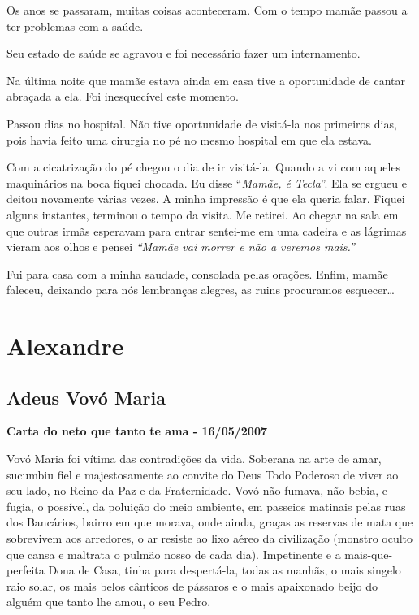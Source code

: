 \documentclass[
  brazil,
  a6paper,
  oneside,
  landscape,
  14pt]{scrbook}
\begin{document}
Os anos se passaram, muitas coisas aconteceram. Com o tempo mamãe passou
a ter problemas com a saúde.

Seu estado de saúde se agravou e foi necessário fazer um internamento.

Na última noite que mamãe estava ainda em casa tive a oportunidade de
cantar abraçada a ela. Foi inesquecível este momento.

Passou dias no hospital. Não tive oportunidade de visitá-la nos
primeiros dias, pois havia feito uma cirurgia no pé no mesmo hospital em
que ela estava.

Com a cicatrização do pé chegou o dia de ir visitá-la. Quando a vi com
aqueles maquinários na boca fiquei chocada. Eu disse ``\emph{Mamãe, é
Tecla}''. Ela se ergueu e deitou novamente várias vezes. A minha
impressão é que ela queria falar. Fiquei alguns instantes, terminou o
tempo da visita. Me retirei. Ao chegar na sala em que outras irmãs
esperavam para entrar sentei-me em uma cadeira e as lágrimas vieram aos
olhos e pensei \emph{``Mamãe vai morrer e não a veremos mais.''}

Fui para casa com a minha saudade, consolada pelas orações. Enfim, mamãe
faleceu, deixando para nós lembranças alegres, as ruins procuramos
esquecer\ldots{}

\hypertarget{alexandre}{%
\section{Alexandre}\label{alexandre}}

\hypertarget{adeus-vovuxf3-maria}{%
\subsection{Adeus Vovó Maria}\label{adeus-vovuxf3-maria}}

\textbf{Carta do neto que tanto te ama - 16/05/2007}

Vovó Maria foi vítima das contradições da vida. Soberana na arte de
amar, sucumbiu fiel e majestosamente ao convite do Deus Todo Poderoso de
viver ao seu lado, no Reino da Paz e da Fraternidade. Vovó não fumava,
não bebia, e fugia, o possível, da poluição do meio ambiente, em
passeios matinais pelas ruas dos Bancários, bairro em que morava, onde
ainda, graças as reservas de mata que sobrevivem aos arredores, o ar
resiste ao lixo aéreo da civilização (monstro oculto que cansa e
maltrata o pulmão nosso de cada dia). Impetinente e a mais-que-perfeita
Dona de Casa, tinha para despertá-la, todas as manhãs, o mais singelo
raio solar, os mais belos cânticos de pássaros e o mais apaixonado beijo
do alguém que tanto lhe amou, o seu Pedro.
\end{document}
